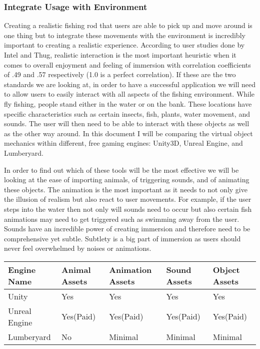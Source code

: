 \documentclass[10pt,journal,compsoc,onecolumn, draftclsnofoot]{IEEEtran}
\begin{document}
\subsubsection{Integrate Usage with Environment}
Creating a realistic fishing rod that users are able to pick up and move around is one thing but to integrate these movements with the environment is incredibly important to creating a realistic experience.
According to user studies done by Intel and Thug\cite{michalak_lind_round1}, realistic interaction is the most important heuristic when it comes to overall enjoyment and feeling of immersion with correlation coefficients of .49 and .57 respectively (1.0 is a perfect correlation).
If these are the two standards we are looking at, in order to have a successful application we will need to allow users to easily interact with all aspects of the fishing environment.
While fly fishing, people stand either in the water or on the bank.
These locations have specific characteristics such as certain insects, fish, plants, water movement, and sounds.
The user will then need to be able to interact with these objects as well as the other way around.
In this document I will be comparing the virtual object mechanics within different, free gaming engines: Unity3D, Unreal Engine, and Lumberyard.

In order to find out which of these tools will be the most effective we will be looking at the ease of importing animals, of triggering sounds, and of animating these objects.
The animation is the most important as it needs to not only give the illusion of realism but also react to user movements.
For example, if the user steps into the water then not only will sounds need to occur but also certain fish animations may need to get triggered such as swimming away from the user.
Sounds have an incredible power of creating immersion and therefore need to be comprehensive yet subtle.
Subtlety is a big part of immersion as users should never feel overwhelmed by noises or animations.

\vspace{2mm}
\begin{table}[h!]
\centering
  \begin{tabu} to 1.0\textwidth { | X[l] || X[c] | X[c] | X[c] | X[c] |  }
  \hline
  Engine Name & Animal Assets & Animation Assets & Sound Assets & Object Assets\\
  \hline
  Unity  & Yes & Yes & Yes & Yes\\
  Unreal Engine &   Yes(Paid) & Yes(Paid) & Yes(Paid) & Yes(Paid)\\
  Lumberyard & No & Minimal & Minimal & Minimal \\
  \hline
  \end{tabu}
\end{table}
\vspace{2mm}
\end{document}

